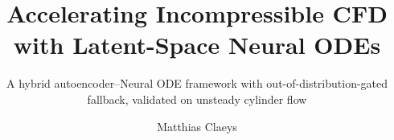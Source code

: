 \documentclass{tudelft-report}
\begin{document}
\frontmatter


\title{Accelerating Incompressible CFD with Latent-Space Neural ODEs}
\subtitle{A hybrid autoencoder–Neural ODE framework with out-of-distribution-gated fallback, validated on unsteady cylinder flow}

\author{Matthias Claeys}

\subject{Msc Thesis} %



\makecover
\clearpage
\thispagestyle{empty}
\null
\clearpage

\clearpage
\thispagestyle{empty}
\null
\clearpage

\clearpage
\thispagestyle{empty}
\null
\clearpage


\tableofcontents
\listoffigures
\listoftables




\mainmatter








% 

% 

\setcounter{biburlnumpenalty}{7000}
\setcounter{biburllcpenalty}{7000}
\setcounter{biburlucpenalty}{7000}

\printbibliography[heading=bibintoc,title=References]


\appendix




\end{document}

